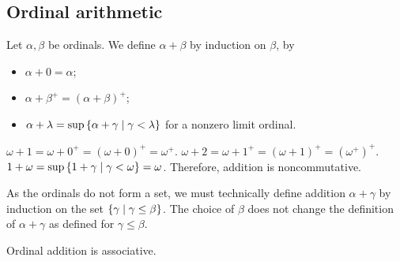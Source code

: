 \subsection{Ordinal arithmetic}
Let \( \alpha, \beta \) be ordinals.
We define \( \alpha + \beta \) by induction on \( \beta \), by
\begin{itemize}
    \item \( \alpha + 0 = \alpha \);
    \item \( \alpha + \beta^+ = (\alpha + \beta)^+ \);
    \item \( \alpha + \lambda = \sup\qty{\alpha + \gamma \mid \gamma < \lambda} \) for a nonzero limit ordinal.
\end{itemize}
\begin{example}
    \( \omega + 1 = \omega + 0^+ = (\omega + 0)^+ = \omega^+ \).
    \( \omega + 2 = \omega + 1^+ = (\omega + 1)^+ = (\omega^+)^+ \).
    \( 1 + \omega = \sup\qty{1 + \gamma \mid \gamma < \omega} = \omega \).
    Therefore, addition is noncommutative.
\end{example}
\begin{remark}
    As the ordinals do not form a set, we must technically define addition \( \alpha + \gamma \) by induction on the set \( \qty{\gamma \mid \gamma \leq \beta} \).
    The choice of \( \beta \) does not change the definition of \( \alpha + \gamma \) as defined for \( \gamma \leq \beta \).
\end{remark}
\begin{proposition}
    Ordinal addition is associative.
\end{proposition}
